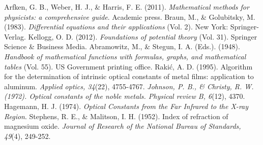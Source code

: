 \documentclass[paper=letter,8.5pt]{article}
\begin{document}
\begin{thebibliography}{99}
 Arfken, G. B., Weber, H. J., \& Harris, F. E. (2011). \textit{Mathematical methods for physicists: a comprehensive guide}. Academic press.
 Braun, M., \& Golubitsky, M. (1983). \textit{Differential equations and their applications} (Vol. 2). New York: Springer-Verlag.
 Kellogg, O. D. (2012). \textit{Foundations of potential theory} (Vol. 31). Springer Science \& Business Media.
 Abramowitz, M., \& Stegun, I. A. (Eds.). (1948). \textit{Handbook of mathematical functions with formulas, graphs, and mathematical tables} (Vol. 55). US Government printing office.
 Rakić, A. D. (1995). Algorithm for the determination of intrinsic optical constants of metal films: application to aluminum. \textit{Applied optics, 34}(22), 4755-4767.
 \textit{Johnson, P. B., \& Christy, R. W. (1972). Optical constants of the noble metals. Physical review B, 6}(12), 4370.
 Hagemann, H. J. (1974). \textit{Optical Constants from the Far Infrared to the X-ray Region}.
 Stephens, R. E., \& Malitson, I. H. (1952). Index of refraction of magnesium oxide. \textit{Journal of Research of the National Bureau of Standards, 49}(4), 249-252.
\end{thebibliography}

\end{document}
